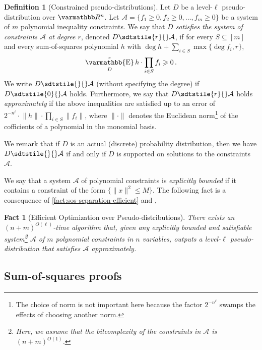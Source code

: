 \documentclass{article}
\newtheorem{fact}[theorem]{Fact}
\theoremstyle{definition}
\newtheorem{definition}[theorem]{Definition}
\theoremstyle{remark}
\let\mathbb\varmathbb
\newcommand{\set}[1]{\{#1\}}
\newcommand{\norm}[1]{\lVert#1\rVert}
\newcommand{\R}{\mathbb R}
\newcommand{\cA}{\mathcal A}
\renewcommand{\leq}{\leqslant}
\renewcommand{\ge}{\geqslant}
\numberwithin{equation}{section}
\DeclareMathOperator{\pE}{\tilde{\mathbb{E}}}
\newcommand{\1}{\bm{1}}
\begin{document}
\begin{definition}[Constrained pseudo-distributions]
	Let $D$ be a level-$\ell$ pseudo-distribution over $\R^n$.
	Let $\cA = \{f_1\ge 0, f_2\ge 0, \ldots, f_m\ge 0\}$ be a system of $m$ polynomial inequality constraints.
	We say that \emph{$D$ satisfies the system of constraints $\cA$ at degree $r$}, denoted $D \sdtstile{r}{} \cA$, if for every $S\subseteq[m]$ and every sum-of-squares polynomial $h$ with $\deg h + \sum_{i\in S} \max\set{\deg f_i,r}$,
	\begin{displaymath}
	\pE_{D} h \cdot \prod _{i\in S}f_i  \ge 0\,.
	\end{displaymath}
	We write $D \sdtstile{}{} \cA$ (without specifying the degree) if $D \sdtstile{0}{} \cA$ holds.
	Furthermore, we say that $D\sdtstile{r}{}\cA$ holds \emph{approximately} if the above inequalities are satisfied up to an error of $2^{-n^\ell}\cdot \norm{h}\cdot\prod_{i\in S}\norm{f_i}$, where $\norm{\cdot}$ denotes the Euclidean norm\footnote{The choice of norm is not important here because the factor $2^{-n^\ell}$ swamps the effects of choosing another norm.} of the cofficients of a polynomial in the monomial basis.
\end{definition}

We remark that if $D$ is an actual (discrete) probability distribution, then we have  $D\sdtstile{}{}\cA$ if and only if $D$ is supported on solutions to the constraints $\cA$.

We say that a system $\cA$ of polynomial constraints is \emph{explicitly bounded} if it contains a constraint of the form $\{ \|x\|^2 \leq M\}$.
The following fact is a consequence of \cref{fact:sos-separation-efficient} and \cite{MR625550-Grotschel81},

\begin{fact}[Efficient Optimization over Pseudo-distributions]
	There exists an $(n+ m)^{O(\ell)} $-time algorithm that, given any explicitly bounded and satisfiable system\footnote{Here, we assume that the bitcomplexity of the constraints in $\cA$ is $(n+m)^{O(1)}$.} $\cA$ of $m$ polynomial constraints in $n$ variables, outputs a level-$\ell$ pseudo-distribution that satisfies $\cA$ approximately. \label{fact:eff-pseudo-distribution}
\end{fact}

\subsection{Sum-of-squares proofs}
\end{document}
